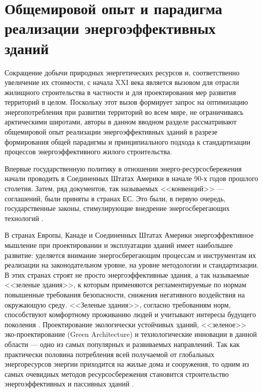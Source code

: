 \section{Общемировой опыт и парадигма реализации энергоэффективных зданий}


Сокращение добычи природных энергетических ресурсов и, соответственно увеличение их стоимости, с начала XXI века является вызовом для отрасли жилищного строительства в частности и
для проектирования мер развития территорий в целом. Поскольку этот вызов формирует запрос на оптимизацию энергопотребления при развитии территорий во всем мире,
не ограничиваясь арктическими широтами, авторы в данном вводном разделе рассматривают общемировой опыт реализации энергоэффективных зданий в разрезе формирования
общей парадигмы и принципиального подхода к стандартизации процессов энергоэффективного жилого строительства.

Впервые государственную политику в отношении энерго-ресурсосбережения начали проводить в Соединенных Штатах Америки в начале 90-х годов прошлого столетия.
Затем, ряд документов, так называемых <<конвенций>> --- соглашений, были приняты в странах ЕС.
Это были, в первую очередь, государственные законы, стимулирующие внедрение энергосберегающих технологий \cite{2010buee_Sormunen_Finland,2020buee_Sheyna_HabitatEurotechInsertion}. %

В странах Европы, Канаде и Соединенных Штатах Америки энергоэффективное мышление при проектировании и эксплуатации зданий имеет наибольшее развитие:
уделяется внимание энергосберегающим процессам и инструментам их реализации на законодательном уровне, на уровне методологии и стандартизации.
В этих странах строят не просто энергоэффективные здания, а так называемые <<зеленые здания>>, к которым применяются регламентируемые по нормам повышенные требования безопасности,
снижения негативного воздействия на окружающую среду.
<<Зеленые здания>>, согласно требованиям норм, способствуют комфортному проживанию людей и учитывают интересы будущего поколения \cite{2020buee_Muhammad_USWastemanagement}.
Проектирование экологически устойчивых зданий, <<зеленое>> эко-проектирование (Green Architecture) \cite{2008buee_wines_green} и технологические инновации в данной области --- одно из самых популярных и
развиваемых направлений.%
Так как практически половина потребления всей получаемой от глобальных энергоресурсов энергии %
приходится на жилые дома и сооружения, то одним из самых очевидных методов ресурсосбережения становится строительство энергоэффективных и пассивных зданий \cite{1979buee_mazria_passive}.


